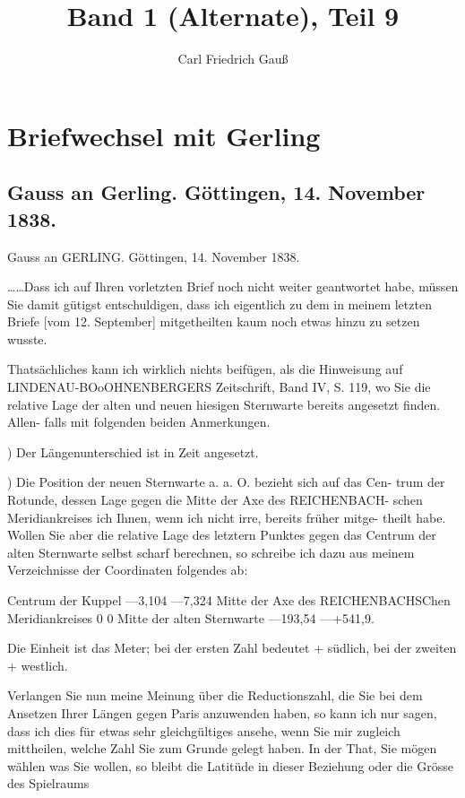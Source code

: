 \documentclass[12pt,a4paper]{article}
\title{Band 1 (Alternate), Teil 9}
\author{Carl Friedrich Gau\ss}
\date{}
\theoremstyle{plain}
\theoremstyle{definition}
\theoremstyle{remark}
\begin{document}
\maketitle

\section*{Briefwechsel mit Gerling}
\subsection*{Gauss an Gerling. Göttingen, 14. November 1838.}

\noindent
Gauss an GERLING. Göttingen, 14. November 1838.

\noindent
\ldots\ldots Dass ich auf Ihren vorletzten Brief noch nicht weiter geantwortet
habe, müssen Sie damit gütigst entschuldigen, dass ich eigentlich zu dem in
meinem letzten Briefe [vom 12. September] mitgetheilten kaum noch etwas
hinzu zu setzen wusste.

\noindent
Thatsächliches kann ich wirklich nichts beifügen, als die Hinweisung auf
LINDENAU-BOoOHNENBERGERS Zeitschrift, Band IV, S. 119, wo Sie die relative
Lage der alten und neuen hiesigen Sternwarte bereits angesetzt finden. Allen-
falls mit folgenden beiden Anmerkungen.

) Der Längenunterschied ist in Zeit angesetzt.

) Die Position der neuen Sternwarte a. a. O. bezieht sich auf das Cen-
trum der Rotunde, dessen Lage gegen die Mitte der Axe des REICHENBACH-
schen Meridiankreises ich Ihnen, wenn ich nicht irre, bereits früher mitge-
theilt habe. Wollen Sie aber die relative Lage des letztern Punktes gegen
das Centrum der alten Sternwarte selbst scharf berechnen, so schreibe ich
dazu aus meinem Verzeichnisse der Coordinaten folgendes ab:

\noindent
Centrum der Kuppel ---3,104 ---7,324
Mitte der Axe des REICHENBACHSChen Meridiankreises 0 0
Mitte der alten Sternwarte ---193,54 ---+541,9.

\noindent
Die Einheit ist das Meter; bei der ersten Zahl bedeutet + südlich, bei
der zweiten + westlich.

\noindent
Verlangen Sie nun meine Meinung über die Reductionszahl, die Sie
bei dem Ansetzen Ihrer Längen gegen Paris anzuwenden haben, so kann ich
nur sagen, dass ich dies für etwas sehr gleichgültiges ansehe, wenn Sie mir
zugleich mittheilen, welche Zahl Sie zum Grunde gelegt haben. In der That,
Sie mögen wählen was Sie wollen, so bleibt die Latitüde in dieser Beziehung
oder die Grösse des Spielraums
\end{document}
